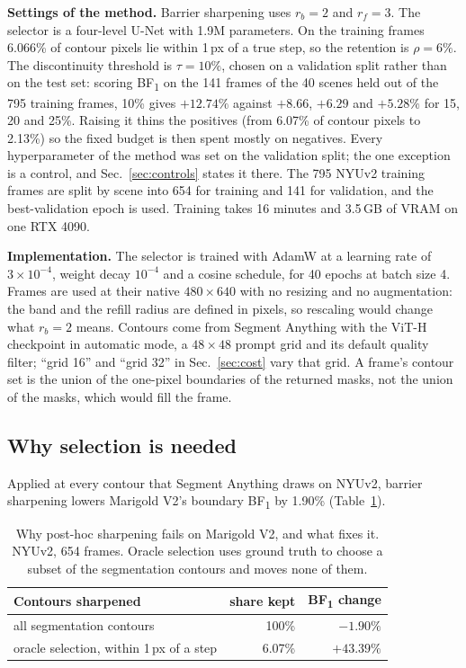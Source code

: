 \documentclass[conference]{IEEEtran}
\newcommand{\bfone}{BF\textsubscript{1}}
\begin{document}
\textbf{Settings of the method.} Barrier sharpening uses $r_b = 2$ and
$r_f = 3$. The selector is a four-level U-Net with 1.9M parameters. On the
training frames 6.066\% of contour pixels lie within 1\,px of a true step, so the
retention is $\rho = 6\%$. The discontinuity threshold is $\tau = 10\%$, chosen on
a validation split rather than on the test set: scoring \bfone{} on the 141
frames of the 40 scenes held out of the 795 training frames, 10\% gives
$+12.74\%$ against $+8.66$, $+6.29$ and $+5.28\%$ for 15, 20 and 25\%. Raising it
thins the positives (from 6.07\% of contour pixels to 2.13\%) so the fixed budget
is then spent mostly on negatives. Every hyperparameter of the method was set on
the validation split; the one exception is a control, and
Sec.~\ref{sec:controls} states it there. The 795 NYUv2 training frames are split
by scene into 654 for training and 141 for validation, and the best-validation epoch
is used. Training takes 16 minutes and 3.5\,GB of VRAM on one
RTX 4090.

\textbf{Implementation.} The selector is trained with AdamW at a learning rate of
$3 \times 10^{-4}$, weight decay $10^{-4}$ and a cosine schedule, for 40 epochs at
batch size 4. Frames are used at their native $480 \times 640$ with no resizing and
no augmentation: the band and the refill radius are defined in pixels, so rescaling
would change what $r_b = 2$ means. Contours come from Segment Anything
\cite{sam} with the ViT-H checkpoint in automatic mode, a $48 \times 48$ prompt
grid and its default quality filter; ``grid 16'' and ``grid 32'' in
Sec.~\ref{sec:cost} vary that grid. A frame's contour set is the union of the
one-pixel boundaries of the returned masks, not the union of the masks, which
would fill the frame.

\subsection{Why selection is needed}
\label{sec:why}
\label{sec:gtsel}

Applied at every contour that Segment Anything draws on NYUv2, barrier
sharpening lowers Marigold V2's boundary \bfone{} by 1.90\%
(Table~\ref{tab:diagnosis}).

\begin{table}[t]
\caption{Why post-hoc sharpening fails on Marigold V2, and what fixes it. \textnormal{NYUv2},
654 frames. Oracle selection uses ground truth to choose a subset of the
segmentation contours and moves none of them.}
\label{tab:diagnosis}
\centering
\begin{tabular}{lrr}
\toprule
Contours sharpened & share kept & \bfone{} change \\
\midrule
all segmentation contours & 100\% & $-1.90\%$ \\
oracle selection, within 1\,px of a step & 6.07\% & $\mathbf{+43.39\%}$ \\
\bottomrule
\end{tabular}
\end{table}
\end{document}
